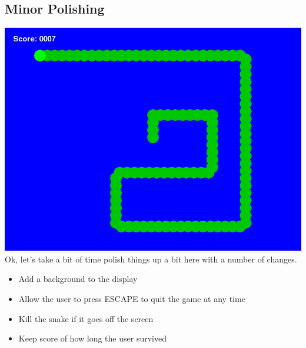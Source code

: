 \documentclass[letterpaper,10pt,english]{sphinxmanual}
\begin{document}
\subsection{Minor Polishing}
\label{tutorial-1:minor-polishing}\includegraphics{ss-1-polish.png}
Ok, let's take a bit of time polish things up a bit here with a number of changes.
\begin{itemize}
\item {} 
Add a background to the display

\item {} 
Allow the user to press ESCAPE to quit the game at any time

\item {} 
Kill the snake if it goes off the screen

\item {} 
Keep score of how long the user survived

\end{itemize}
\end{document}
